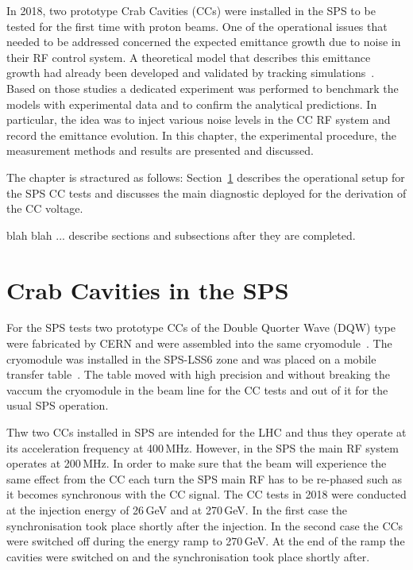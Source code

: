 \vspace*{1mm}
In 2018, two prototype Crab Cavities (CCs) were installed in the SPS to be tested for the first time with proton beams. One of the operational issues that needed to be addressed concerned the expected emittance growth due to noise in their RF control system. A theoretical model that describes this emittance growth had already been developed and validated by tracking simulations~\cite{PhysRevSTAB.18.101001}. Based on those studies a dedicated experiment was performed to benchmark the models with experimental data and to confirm the analytical predictions. In particular, the idea was to inject various noise levels in the CC RF system and record the emittance evolution. In this chapter, the experimental procedure, the measurement methods and results are presented and discussed.
 
The chapter is stractured as follows: Section~\ref{sec:CC_SPS_setup} describes the operational setup for the SPS CC tests and discusses the main diagnostic deployed for the derivation of the CC voltage.

blah blah ... describe sections and subsections after they are completed.

\section{Crab Cavities in the SPS}\label{sec:CC_SPS_setup}

For the SPS tests two prototype CCs of the Double Quorter Wave (DQW) type were fabricated by CERN and were assembled into the same cryomodule~\cite{Zanoni:2017}. The cryomodule was installed in the SPS-LSS6 zone and was placed on a mobile transfer table~\cite{Garlaschè:2648553}. The table moved with high precision and without breaking the vaccum the cryomodule in the beam line for the CC tests and out of it for the usual SPS operation.

Thw two CCs installed in SPS are intended for the LHC and thus they operate at its acceleration frequency at 400\,MHz. However, in the SPS the main RF system operates at 200\,MHz. In order to make sure that the beam will experience the same effect from the CC  each turn the SPS main RF has to be re-phased such as it becomes synchronous with the CC signal. The CC tests in 2018 were conducted at the injection energy of 26\,GeV and at 270\,GeV. In the first case the synchronisation took place shortly after the injection. In the second case the CCs were switched off during the energy ramp to 270\,GeV. At the end of the ramp the cavities were switched on and the synchronisation took place shortly after.


